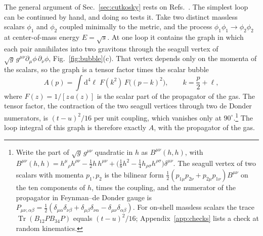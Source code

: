 \documentclass[aps,prd,10pt,twocolumn,superscriptaddress,nofootinbib,floatfix,longbibliography]{revtex4-2}
\newcommand{\dd}{\mathrm{d}}
\newcommand{\Tr}{\operatorname{Tr}}
\begin{document}
The general argument of Sec.~\ref{sec:cutkosky} rests on Refs.~\cite{PiusSen2016,BrisceseModesto2019}. The simplest loop can be continued by hand, and doing so tests it. Take two distinct massless scalars $\phi_1$ and $\phi_2$ coupled minimally to the metric, and the process $\phi_1\phi_1\to\phi_2\phi_2$ at center-of-mass energy $E=\sqrt s$. At one loop it contains the graph in which each pair annihilates into two gravitons through the seagull vertex of $\sqrt g\,g^{\mu\nu}\partial_\mu\phi\,\partial_\nu\phi$, Fig.~\ref{fig:bubble}(c). That vertex depends only on the momenta of the scalars, so the graph is a tensor factor times the scalar bubble
\begin{equation}
\label{eq:bubble}
A(p)=\int\dd^4\ell\;F(k^2)\,F\bigl((p-k)^2\bigr),\qquad k=\frac p2+\ell ,
\end{equation}
where $F(z)=1/[z\,a(z)]$ is the scalar part of the propagator of the gas.
The tensor factor, the contraction of the two seagull vertices through two de Donder numerators, is $(t-u)^2/16$ per unit coupling, which vanishes only at $90^\circ$.\footnote{Write the part of $\sqrt g\,g^{\mu\nu}$ quadratic in $h$ as $B^{\mu\nu}(h,h)$, with $B^{\mu\nu}(h,h)=h^{\mu}{}_{\rho}h^{\rho\nu}-\frac12h\,h^{\mu\nu}+\bigl(\frac18h^2-\frac14h_{\rho\sigma}h^{\rho\sigma}\bigr)\delta^{\mu\nu}$. The seagull vertex of two scalars with momenta $p_1,p_2$ is the bilinear form $\frac12(p_{1\mu}p_{2\nu}+p_{2\mu}p_{1\nu})B^{\mu\nu}$ on the ten components of $h$, times the coupling, and the numerator of the propagator in Feynman--de Donder gauge is $P_{\mu\nu,\alpha\beta}=\frac12(\delta_{\mu\alpha}\delta_{\nu\beta}+\delta_{\mu\beta}\delta_{\nu\alpha}-\delta_{\mu\nu}\delta_{\alpha\beta})$. For on-shell massless scalars the trace $\Tr(B_{12}PB_{34}P)$ equals $(t-u)^2/16$; Appendix~\ref{app:checks} lists a check at random kinematics.} The loop integral of this graph is therefore exactly $A$, with the propagator of the gas.
\end{document}
